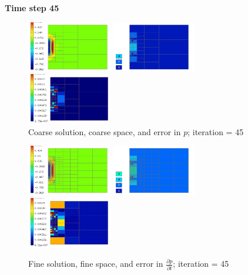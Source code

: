 \textbf{Time step 45}
\begin{figure}[H]
		\includegraphics[width=0.33\textwidth]{img/acoustics/Solution_45.png}\hspace{1mm}
		\includegraphics[width=0.33\textwidth]{img/acoustics/Space_45.png}\hspace{1mm}
		\includegraphics[width=0.33\textwidth]{img/acoustics/ErrorValue_45.png}\\
		\caption{Coarse solution, coarse space, and error in $p$; iteration = 45}
\vspace{5mm}
		\includegraphics[width=0.33\textwidth]{img/acoustics/RefSolution_45.png}\hspace{1mm}
		\includegraphics[width=0.33\textwidth]{img/acoustics/RefSpace_45.png}\hspace{1mm}
		\includegraphics[width=0.33\textwidth]{img/acoustics/ErrorDerivative_45.png}\\
		\caption{Fine solution, fine space, and error in $\frac{\partial p}{\partial t}$; iteration = 45}
	\end{figure}
	
